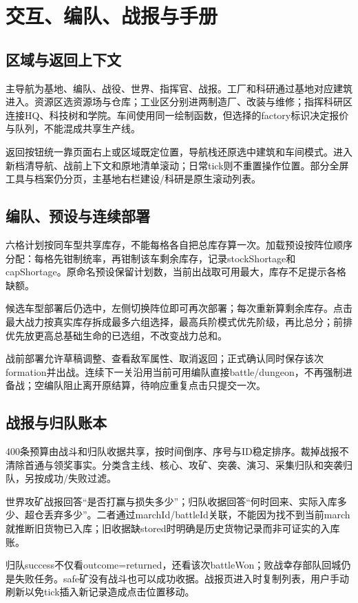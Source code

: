 \chapter{交互、编队、战报与手册}
\section{区域与返回上下文}
主导航为基地、编队、战役、世界、指挥官、战报。工厂和科研通过基地对应建筑进入。资源区选资源场与仓库；工业区分别进两制造厂、改装与维修；指挥科研区连接HQ、科技树和学院。车间使用同一绘制函数，但选择的factory标识决定报价与队列，不能混成共享生产线。

返回按钮统一靠页面右上或区域既定位置，导航栈还原选中建筑和车间模式。进入新档清导航、战前上下文和原地清单滚动；日常tick则不重置操作位置。部分全屏工具与档案仍分页，主基地右栏建设/科研是原生滚动列表。

\section{编队、预设与连续部署}
六格计划按同车型共享库存，不能每格各自把总库存算一次。加载预设按阵位顺序分配：每格先钳制统率，再钳制该车剩余库存，记录stockShortage和capShortage。原命名预设保留计划数，当前出战取可用最大，库存不足提示各格缺额。

候选车型部署后仍选中，左侧切换阵位即可再次部署；每次重新算剩余库存。点击最大战力按真实库存拆成最多六组选择，最高兵阶模式优先阶级，再比总分；前排优先放更高总基础生命的已选组，不改变战力总和。

战前部署允许草稿调整、查看敌军属性、取消返回；正式确认同时保存该次formation并出战。连续下一关沿用当前可用编队直接battle/dungeon，不再强制进备战；空编队阻止离开原结算，待响应重复点击只提交一次。

\section{战报与归队账本}
400条预算由战斗和归队收据共享，按时间倒序、序号与ID稳定排序。裁掉战报不清除首通与领奖事实。分类含主线、核心、攻矿、突袭、演习、采集归队和突袭归队，另按成功/失败过滤。

世界攻矿战报回答“是否打赢与损失多少”；归队收据回答“何时回来、实际入库多少、超仓丢弃多少”。二者通过marchId/battleId关联，不能因为找不到当前march就推断旧货物已入库；旧收据缺stored时明确是历史货物记录而非可证实的入库账。

归队success不仅看outcome=returned，还看该次battleWon；败战幸存部队回城仍是失败任务。safe矿没有战斗也可以成功收据。战报页进入时复制列表，用户手动刷新以免tick插入新记录造成点击位置移动。


